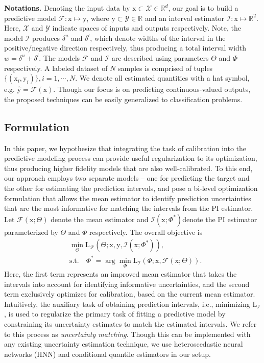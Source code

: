 \documentclass[letterpaper]{article} %
\begin{document}
\noindent \textbf{Notations.} Denoting the input data by $\mathrm{x} \subset \mathcal{X} \in \mathbb{R}^d$, our goal is to build a predictive model $\mathcal{F}: \mathrm{x} \mapsto \mathrm{y}$, where $\mathrm{y} \subset \mathcal{Y} \in \mathbb{R}$ and an interval estimator $\mathcal{I}: \mathrm{x} \mapsto \mathbb{R}^2$. Here, $\mathcal{X}$ and $\mathcal{Y}$ indicate spaces of inputs and outputs respectively. Note, the model $\mathcal{I}$ produces $\delta^u$ and $\delta^l$, which denote widths of the interval in the positive/negative direction respectively, thus producing a total interval width $w = \delta^u + \delta^l$. The models $\mathcal{F}$ and $\mathcal{I}$ are described using parameters $\Theta$ and $\Phi$ respectively. A labeled dataset of $N$ samples is comprised of tuples $\{(\mathrm{x}_i, \mathrm{y}_i)\}, i = 1, \cdots, N$. We denote all estimated quantities with a hat symbol, e.g. $\hat{\mathrm{y}} = \mathcal{F}(\mathrm{x})$. Though our focus is on predicting continuous-valued outputs, the proposed techniques can be easily generalized to classification problems.

\subsection{Formulation}
In this paper, we hypothesize that integrating the task of calibration into the predictive modeling process can provide useful regularization to its optimization, thus producing higher fidelity models that are also well-calibrated. To this end, our approach employs two separate models -- one for predicting the target and the other for estimating the prediction intervals, and pose a bi-level optimization formulation that allows the mean estimator to identify prediction uncertainties that are the most informative for matching the intervals from the PI estimator. Let $\mathcal{F}(\mathrm{x}; \Theta)$ denote the mean estimator and $\mathcal{I}(\mathrm{x}; \Phi^*)$denote the PI estimator parameterized by $\Theta$ and $\Phi$ respectively. The overall objective is
\begin{align}
\nonumber &\min_{\Theta} \mathrm{L}_{\mathcal{F}}\left(\Theta; \mathrm{x}, \mathrm{y}, \mathcal{I}(\mathrm{x}; \Phi^*)\right), \\
&\text{s.t.} \quad \Phi^* = \arg \min_{\Phi} \mathrm{L}_{\mathcal{I}}(\Phi; \mathrm{x}, \mathcal{F}(\mathrm{x}; \Theta)).
\label{eqn:obj}
\end{align}
Here, the first term represents an improved mean estimator that takes the intervals into account for identifying informative uncertainties, and the second term exclusively optimizes for calibration, based on the current mean estimator. Intuitively, the auxiliary task of obtaining prediction intervals, i.e., minimizing $\mathrm{L}_{\mathcal{I}}$, is used to regularize the primary task of fitting a predictive model by constraining its uncertainty estimates to match the estimated intervals. We refer to this process as \textit{uncertainty matching}. Though this can be implemented with any existing uncertainty estimation technique, we use heteroscedastic neural networks (HNN) and conditional quantile estimators in our setup.
\end{document}
